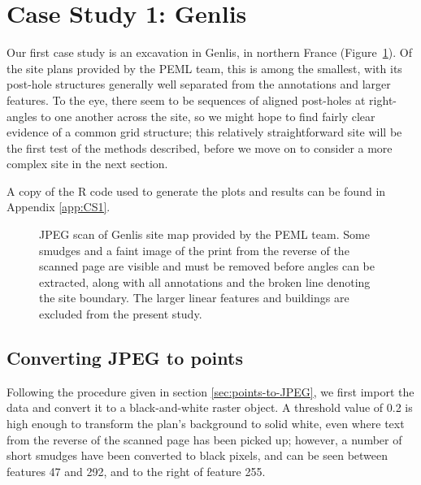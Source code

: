 \documentclass[../../ArchStats.tex]{subfiles}
\begin{document}
\section{Case Study 1: Genlis}
\label{sec:CS1}

Our first case study is an excavation in Genlis, in northern France (Figure~\ref{fig:Genlis-JPEG}). Of the site plans provided by the PEML team, this is among the smallest, with its post-hole structures generally well separated from the annotations and larger features.  To the eye, there seem to be sequences of aligned post-holes at right-angles to one another across the site, so we might hope to find fairly clear evidence of a common grid structure; this relatively straightforward site will be the first test of the methods described,  before we move on to consider a more complex site in the next section.

A copy of the R code used to generate the plots and results can be found in Appendix \ref{app:CS1}.

\begin{figure}[!ht]
\centering
\caption{JPEG scan of Genlis site map provided by the PEML team. Some smudges and a faint image of the print from the reverse of the scanned page are visible and must be removed before angles can be extracted, along with all annotations and the broken line denoting the site boundary. The larger linear features and buildings are excluded from the present study.}
\label{fig:Genlis-JPEG}
\end{figure}


\subsection{Converting JPEG to points}

Following the procedure given in section \ref{sec:points-to-JPEG}, we first import the data and convert it to a black-and-white raster object. A threshold value of 0.2 is high enough to transform the plan's background to solid white, even where text from the reverse of the scanned page has been picked up; however, a number of short smudges have been converted to black pixels, and can be seen between features 47 and 292, and to the right of feature 255.
\end{document}
